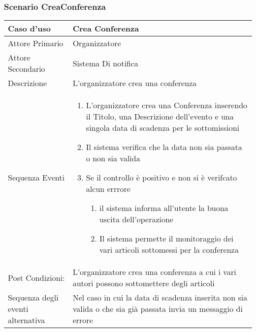 \subsubsection{Scenario CreaConferenza}
\begin{tabular}{|p{3cm}|p{7cm}|}
\hline 
\rowcolor{Orchid}
Caso d'uso & Crea Conferenza \\
\hline
Attore Primario & Organizzatore\\
\hline
Attore Secondario & Sistema Di notifica\\
\hline
Descrizione & L'organizzatore crea una conferenza \\
\hline
  Sequenza Eventi &
                    \begin{enumerate}
                    \item L'organizzatore crea una Conferenza inserendo il Titolo, una Descrizione dell'evento e una singola data di scadenza per le sottomissioni
                    \item Il sistema verifica che la data non sia passata o non sia valida
                    \item Se il controllo è positivo e non si è verifcato alcun errrore
                      \begin{enumerate}
                      \item il sistema informa all'utente la buona uscita dell'operazione
                      \item Il sistema permette il monitoraggio dei vari articoli sottomessi per la conferenza
                      \end{enumerate}
                    \end{enumerate}\\
\hline
Post Condizioni: & L'organizzatore crea una conferenza a cui i vari autori possono sottomettere degli articoli \\
\hline
Sequenza degli eventi alternativa & Nel caso in cui la data di scadenza inserita non sia valida o che sia già passata invia un messaggio di errore \\
\hline
\end{tabular}

